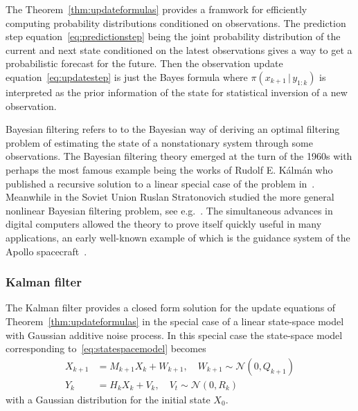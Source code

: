 The Theorem~\ref{thm:updateformulas} provides a framwork for efficiently computing probability distributions conditioned on observations.
The prediction step equation~\ref{eq:predictionstep} being the joint probability distribution of the current and next state conditioned on the latest observations gives a way to get a probabilistic forecast for the future.
Then the observation update equation~\ref{eq:updatestep} is just the Bayes formula where $\pi (x_{k+1} \, \vert \, y_{1:k})$ is interpreted as the prior information of the state for statistical inversion of a new observation.

Bayesian filtering refers to to the Bayesian way of deriving an optimal filtering problem of estimating the state of a nonstationary system through some observations.
The Bayesian filtering theory emerged at the turn of the 1960s with perhaps the most famous example being the works of Rudolf E. Kálmán who published a recursive solution to a linear special case of the problem in~\cite{kalman}.
Meanwhile in the Soviet Union Ruslan Stratonovich studied the more general nonlinear Bayesian filtering problem, see e.g.~\cite{stratonovich2, stratonovich1}.
The simultaneous advances in digital computers allowed the theory to prove itself quickly useful in many applications, an early well-known example of which is the guidance system of the Apollo spacecraft~\cite{mcgee}.

\subsubsection{Kalman filter}
The Kalman filter provides a closed form solution for the update equations of Theorem~\ref{thm:updateformulas} in the special case of a linear state-space model with Gaussian additive noise process.
In this special case the state-space model corresponding to~\eqref{eq:statespacemodel} becomes
\begin{subequations}\label{eq:kalmanstatespace}
    \begin{align}
        X_{k+1} &= M_{k+1}X_{k}  + W_{k+1}, \quad W_{k+1} \sim \mathcal{N}(0, Q_{k+1})\\
        Y_{k} &= H_{k}X_{k} + V_{k}, \quad V_t \sim \mathcal{N}(0, R_k)
    \end{align}
\end{subequations}
with a Gaussian distribution for the initial state $X_0$.

